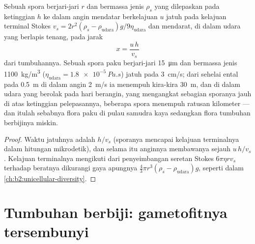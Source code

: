 \begin{theorem}\label{thm:b2:plant-life-cycles:dispersal}
Sebuah spora berjari-jari $r$ dan bermassa jenis $\rho_s$ yang
dilepaskan pada ketinggian $h$ ke dalam angin mendatar berkelajuan $u$
jatuh pada kelajuan terminal Stokes
$v_s = 2r^2(\rho_s - \rho_{\text{udara}})g/9\eta_{\text{udara}}$
dan mendarat, di dalam udara yang berlapis tenang, pada jarak
\[
x = \frac{u\,h}{v_s}
\]
dari tumbuhannya. Sebuah spora paku berjari-jari \qty{15}{\micro m} dan
bermassa jenis \qty{1100}{kg/m^3} ($\eta_{\text{udara}} = \qty{1.8e-5}{Pa.s}$)
jatuh pada \qty{3}{cm/s}; dari sehelai ental pada \qty{0.5}{m} di dalam
angin \qty{2}{m/s} ia menempuh kira-kira \qty{30}{m}, dan di dalam
udara yang berolak pada hari berangin, yang mengangkat sebagian
sporanya jauh di atas ketinggian pelepasannya, beberapa spora menempuh
ratusan kilometer --- dan itulah sebabnya flora paku di pulau samudra
kaya sedangkan flora tumbuhan berbijinya miskin.
\end{theorem}
\begin{proof}
Waktu jatuhnya adalah $h/v_s$ (sporanya mencapai kelajuan terminalnya
dalam hitungan mikrodetik), dan selama itu anginnya membawanya sejauh
$u\,h/v_s$. Kelajuan terminalnya mengikuti dari penyeimbangan seretan
Stokes $6\pi\eta r
v_s$ terhadap beratnya dikurangi gaya apungnya $\tfrac43\pi r^3(\rho_s -
\rho_{\text{udara}})g$, seperti dalam \cref{ch:b2:unicellular-diversity}.
\end{proof}

\section{Tumbuhan berbiji: gametofitnya tersembunyi}


